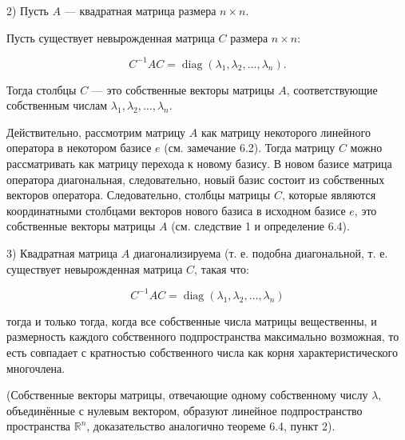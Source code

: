 {2) Пусть \( A \) — квадратная матрица размера \( n \times n \).

Пусть существует невырожденная матрица \( C \) размера \( n \times n \):



\[
C^{-1}AC = \operatorname{diag} (\lambda_1, \lambda_2, \dots, \lambda_n).
\]



Тогда столбцы \( C \) — это собственные векторы матрицы \( A \), соответствующие собственным числам \( \lambda_1, \lambda_2, \dots, \lambda_n \).

Действительно, рассмотрим матрицу \( A \) как матрицу некоторого линейного оператора в некотором базисе \( e \) (см. замечание 6.2). Тогда матрицу \( C \) можно рассматривать как матрицу перехода к новому базису. В новом базисе матрица оператора диагональная, следовательно, новый базис состоит из собственных векторов оператора. Следовательно, столбцы матрицы \( C \), которые являются координатными столбцами векторов нового базиса в исходном базисе \( e \), это собственные векторы матрицы \( A \) (см. следствие 1 и определение 6.4).

3) Квадратная матрица \( A \) диагонализируема (т. е. подобна диагональной, т. е. существует невырожденная матрица \( C \), такая что:



\[
C^{-1}AC = \operatorname{diag} (\lambda_1, \lambda_2, \dots, \lambda_n)
\]



тогда и только тогда, когда все собственные числа матрицы вещественны, и размерность каждого собственного подпространства максимально возможная, то есть совпадает с кратностью собственного числа как корня характеристического многочлена.

(Собственные векторы матрицы, отвечающие одному собственному числу \( \lambda \), объединённые с нулевым вектором, образуют линейное подпространство пространства \( \mathbb{R}^n \), доказательство аналогично теореме 6.4, пункт 2).

 

}